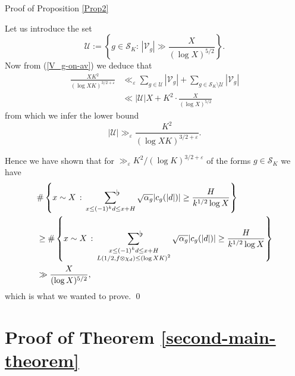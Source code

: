 \documentclass[a4paper,10pt,twoside]{amsart}
\theoremstyle{definition}
\numberwithin{equation}{section}
\newcommand\eps{\varepsilon}
\renewcommand\:{\colon}
\newcommand{\sumflat}{\mathop{{\sum}^{\raisebox{-3pt}{\makebox[0pt][l]{$\flat$}}}}}
\begin{document}
\begin{subsection}{Proof of Proposition \ref{Prop2}}

\noindent Let us introduce the set
\[\mathcal U:=\left\{g\in\mathcal S_K:\,|\mathcal V_g|\gg\frac{X}{(\log X)^{5/2}}\right\}.\]
Now from (\ref{V_g-on-av}) we deduce that 
\begin{align*}
\frac{XK^2}{(\log XK)^{3/2+\eps}}&\ll_\eps\sum_{g\in\mathcal U}\left|\mathcal V_g\right|+\sum_{g\in \mathcal S_K\setminus\mathcal U}\left|\mathcal V_g\right|\\
&\ll |\mathcal U|X+K^2\cdot\frac X{(\log X)^{5/2}}
\end{align*}
from which we infer the lower bound 
\[|\mathcal U|\gg_\eps\frac{K^2}{(\log XK)^{3/2+\eps}}. \]

\noindent Hence we have shown that for $\gg_\eps K^2/(\log K)^{3/2+\eps}$ of the forms $g\in \mathcal S_K$ we have
\begin{align*}
&\#\left\{x\sim X\,:\,\sumflat_{x\leq (-1)^kd\leq x+H}\sqrt{\alpha_g}|c_g(|d|)|\geq\frac H{k^{1/2}\log X}\right\}\\
&\geq\#\left\{x\sim X\,:\,\sumflat_{\substack{x\leq (-1)^kd\leq x+H\\
L(1/2,f\otimes\chi_d)\leq (\log XK)^2}}\sqrt{\alpha_g}|c_g(|d|)|\geq\frac H{k^{1/2}\log X}\right\}\\
&\gg\frac X{(\log X)^{5/2}},
\end{align*}
which is what we wanted to prove. \qed

\end{subsection}

\section{Proof of Theorem \ref{second-main-theorem}}
\end{document}
